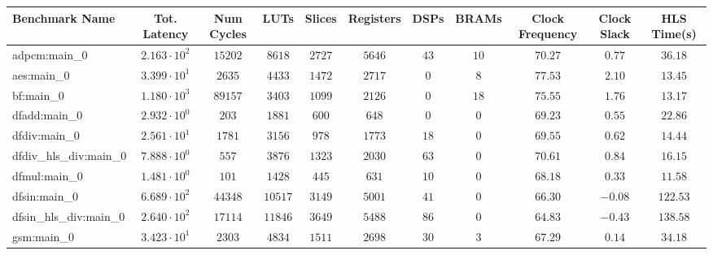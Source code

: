 \begin{tabular}{|l|c|c|c|c|c|c|c|c|c|c|}
\hline
Benchmark Name          & Tot. Latency           & Num Cycles & LUTs      & Slices    & Registers & DSPs    & BRAMs   & Clock Frequency & Clock Slack & HLS Time(s) \\
\hline
adpcm:main\_0           & $ 2.163 \cdot 10^{2} $ & $ 15202  $ & $ 8618  $ & $ 2727  $ & $ 5646  $ & $ 43  $ & $ 10  $ & $ 70.27       $ & $ 0.77    $ & $ 36.18   $ \\
aes:main\_0             & $ 3.399 \cdot 10^{1} $ & $ 2635   $ & $ 4433  $ & $ 1472  $ & $ 2717  $ & $ 0   $ & $ 8   $ & $ 77.53       $ & $ 2.10    $ & $ 13.45   $ \\
bf:main\_0              & $ 1.180 \cdot 10^{3} $ & $ 89157  $ & $ 3403  $ & $ 1099  $ & $ 2126  $ & $ 0   $ & $ 18  $ & $ 75.55       $ & $ 1.76    $ & $ 13.17   $ \\
dfadd:main\_0           & $ 2.932 \cdot 10^{0} $ & $ 203    $ & $ 1881  $ & $ 600   $ & $ 648   $ & $ 0   $ & $ 0   $ & $ 69.23       $ & $ 0.55    $ & $ 22.86   $ \\
dfdiv:main\_0           & $ 2.561 \cdot 10^{1} $ & $ 1781   $ & $ 3156  $ & $ 978   $ & $ 1773  $ & $ 18  $ & $ 0   $ & $ 69.55       $ & $ 0.62    $ & $ 14.44   $ \\
dfdiv\_hls\_div:main\_0 & $ 7.888 \cdot 10^{0} $ & $ 557    $ & $ 3876  $ & $ 1323  $ & $ 2030  $ & $ 63  $ & $ 0   $ & $ 70.61       $ & $ 0.84    $ & $ 16.15   $ \\
dfmul:main\_0           & $ 1.481 \cdot 10^{0} $ & $ 101    $ & $ 1428  $ & $ 445   $ & $ 631   $ & $ 10  $ & $ 0   $ & $ 68.18       $ & $ 0.33    $ & $ 11.58   $ \\
dfsin:main\_0           & $ 6.689 \cdot 10^{2} $ & $ 44348  $ & $ 10517 $ & $ 3149  $ & $ 5001  $ & $ 41  $ & $ 0   $ & $ 66.30       $ & $ -0.08   $ & $ 122.53  $ \\
dfsin\_hls\_div:main\_0 & $ 2.640 \cdot 10^{2} $ & $ 17114  $ & $ 11846 $ & $ 3649  $ & $ 5488  $ & $ 86  $ & $ 0   $ & $ 64.83       $ & $ -0.43   $ & $ 138.58  $ \\
gsm:main\_0             & $ 3.423 \cdot 10^{1} $ & $ 2303   $ & $ 4834  $ & $ 1511  $ & $ 2698  $ & $ 30  $ & $ 3   $ & $ 67.29       $ & $ 0.14    $ & $ 34.18   $ \\

\end{tabular}
